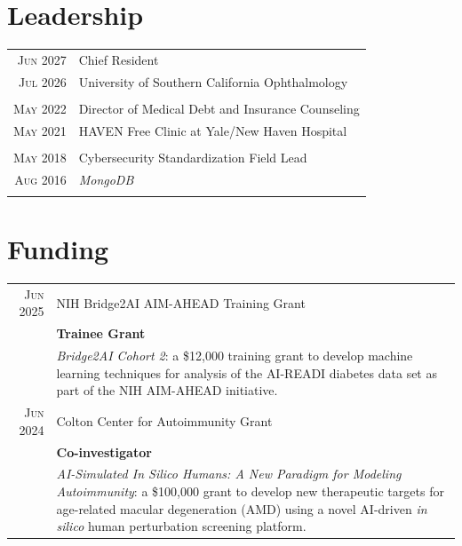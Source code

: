\documentclass[a4paper,10pt]{article}
\begin{document}
\section{Leadership}
\begin{longtable}{r|p{11cm}}
 \nopagebreak \textsc{Jun 2027} & Chief Resident \\
 \nopagebreak \textsc{Jul 2026} & University of Southern California Ophthalmology\\
 \multicolumn{2}{c}{} \\
 \nopagebreak \textsc{May 2022} & Director of Medical Debt and Insurance Counseling\\
 \nopagebreak \textsc{May 2021} &  \small{HAVEN Free Clinic at Yale/New Haven Hospital}\\
 \multicolumn{2}{c}{} \\
 \nopagebreak \textsc{May 2018} & Cybersecurity Standardization Field Lead \\
 \nopagebreak \textsc{Aug 2016} & \small\emph{MongoDB} \\
 \multicolumn{2}{c}{} \\
\end{longtable}


\section{Funding}
\begin{tabular}{rp{11cm}}
\textsc{Jun} 2025 & NIH Bridge2AI AIM-AHEAD Training Grant \\
 							    & \textbf{Trainee Grant} \\
								& \textit{Bridge2AI Cohort 2}: a \$12,000 training grant to develop machine learning techniques for analysis of the AI-READI diabetes data set as part of the NIH AIM-AHEAD initiative. \\
\textsc{Jun} 2024 & Colton Center for Autoimmunity Grant \\
 							    & \textbf{Co-investigator} \\
								& \textit{AI-Simulated In Silico Humans: A New Paradigm for Modeling Autoimmunity}: a \$100,000 grant to develop new therapeutic targets for age-related macular degeneration (AMD) using a novel AI-driven \textit{in silico} human perturbation screening platform.
\end{tabular}

\end{document}
